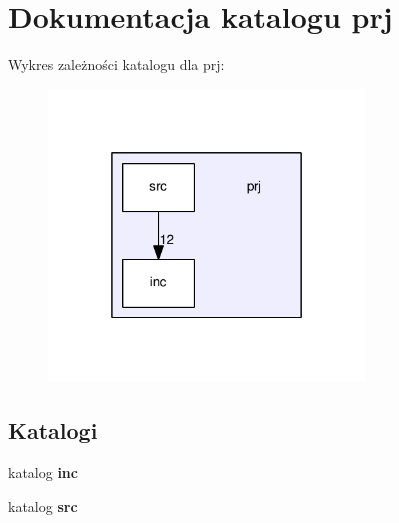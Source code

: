 \section{Dokumentacja katalogu prj}
\label{dir_4aa64b0872d36146e049722e293482e3}
Wykres zależności katalogu dla prj\-:
\nopagebreak
\begin{figure}[H]
\begin{center}
\leavevmode
\includegraphics[width=238pt]{dir_4aa64b0872d36146e049722e293482e3_dep}
\end{center}
\end{figure}
\subsection*{Katalogi}
\begin{DoxyCompactItemize}
\item 
katalog {\bf inc}
\item 
katalog {\bf src}
\end{DoxyCompactItemize}
